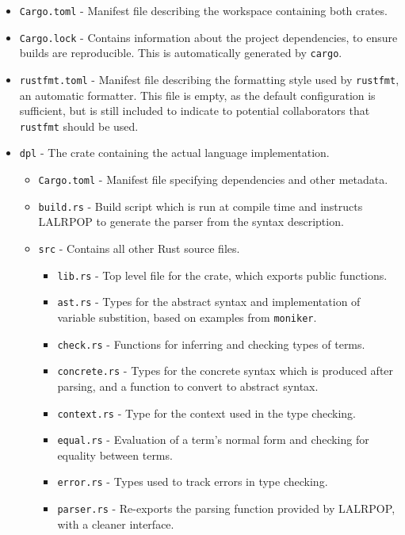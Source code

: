 \documentclass[12pt,a4paper,twoside]{report}
\begin{document}
\begin{itemize}
    \item \texttt{Cargo.toml} - Manifest file describing the workspace containing both crates.
    \item \texttt{Cargo.lock} - Contains information about the project dependencies, to ensure builds are reproducible. This is automatically generated by \texttt{cargo}.
    \item \texttt{rustfmt.toml} - Manifest file describing the formatting style used by \texttt{rustfmt}, an automatic formatter.
          This file is empty, as the default configuration is sufficient, but is still included to indicate to potential collaborators that \texttt{rustfmt} should be used.
    \item \texttt{dpl} - The crate containing the actual language implementation.
          \begin{itemize}
              \item \texttt{Cargo.toml} - Manifest file specifying dependencies and other metadata.
              \item \texttt{build.rs} - Build script which is run at compile time and instructs LALRPOP to generate the parser from the syntax description.
              \item \texttt{src} - Contains all other Rust source files.
                    \begin{itemize}
                        \item \texttt{lib.rs} - Top level file for the crate, which exports public functions.
                        \item \texttt{ast.rs} - Types for the abstract syntax and implementation of variable substition, based on examples from \texttt{moniker}.
                        \item \texttt{check.rs} - Functions for inferring and checking types of terms.
                        \item \texttt{concrete.rs} - Types for the concrete syntax which is produced after parsing, and a function to convert to abstract syntax.
                        \item \texttt{context.rs} - Type for the context used in the type checking.
                        \item \texttt{equal.rs} - Evaluation of a term's normal form and checking for equality between terms.
                        \item \texttt{error.rs} - Types used to track errors in type checking.
                        \item \texttt{parser.rs} - Re-exports the parsing function provided by LALRPOP, with a cleaner interface.

\end{itemize}
\end{itemize}
\end{itemize}
\end{document}
